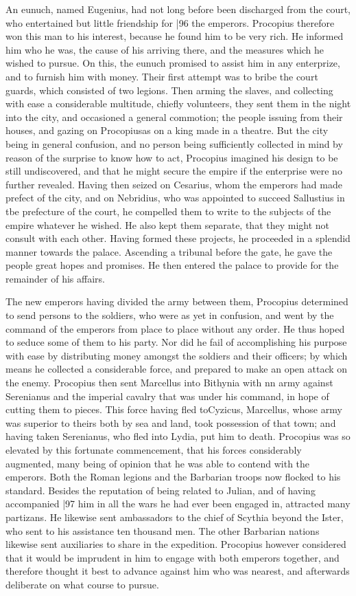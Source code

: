 An eunuch, named Eugenius, had not long before been discharged from the court, who entertained but little friendship for
|96 the emperors. Procopius therefore won this man to his interest, because he found him to be very rich. He informed him who he was, the cause of his arriving there, and the measures which he wished to pursue. On this, the eunuch promised to assist him in any enterprize, and to furnish him with money. Their first attempt was to bribe the court guards, which consisted of two legions. Then arming the slaves, and collecting with ease a considerable multitude, chiefly volunteers, they sent them in the night into the city, and occasioned a general commotion; the people issuing from their houses, and gazing on Procopiusas on a king made in a theatre. But the city being in general confusion, and no person being sufficiently collected in mind by reason of the surprise to know how to act, Procopius imagined his design to be still undiscovered, and that he might secure the empire if the enterprise were no further revealed. Having then seized on Cesarius, whom the emperors had made prefect of the city, and on Nebridius, who was appointed to succeed Sallustius in tbe prefecture of the court, he compelled them to write to the subjects of the empire whatever he wished. He also kept them separate, that they might not consult with each other. Having formed these projects, he proceeded in a splendid manner towards the palace. Ascending a tribunal before the gate, he gave the people great hopes and promises. He then entered the palace to provide for the remainder of his affairs.

The new emperors having divided the army between them, Procopius determined to send persons to the soldiers, who were as yet in confusion, and went by the command of the emperors from place to place without any order. He thus hoped to seduce some of them to his party. Nor did he fail of accomplishing his purpose with ease by distributing money amongst the soldiers and their officers; by which means he collected a considerable force, and prepared to make an open attack on the enemy. Procopius then sent Marcellus into Bithynia with nn army against Serenianus and the imperial cavalry that was under his command, in hope of cutting them to pieces. This force having fled toCyzicus, Marcellus, whose army was superior to theirs both by sea and land, took possession of that town; and having taken Serenianus, who fled into Lydia, put him to death. Procopius was so elevated by this fortunate commencement, that his forces considerably augmented, many being of opinion that he was able to contend with the emperors. Both the Roman legions and the Barbarian troops now flocked to his standard. Besides the reputation of being related to Julian, and of having accompanied
|97 him in all the wars he had ever been engaged in, attracted many partizans. He likewise sent ambassadors to the chief of Scythia beyond the Ister, who sent to his assistance ten thousand men. The other Barbarian nations likewise sent auxiliaries to share in the expedition. Procopius however considered that it would be imprudent in him to engage with both emperors together, and therefore thought it best to advance against him who was nearest, and afterwards deliberate on what course to pursue.

